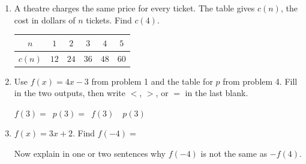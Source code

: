 \documentclass[12pt]{article}
\begin{document}
\begin{enumerate}[label=\textbf{\arabic*.}, leftmargin=1.15cm, itemsep=0pt, topsep=6pt]
\item \begin{minipage}[t]{\linewidth}\vspace{0pt}
A theatre charges the same price for every ticket. The table gives $c(n)$, the cost in dollars of $n$ tickets. Find $c(4)$.
\par\vspace{0.15cm}
\begin{center}
\begin{tabular}{|c|c|c|c|c|c|}
\hline
\textbf{$n$} & $1$ & $2$ & $3$ & $4$ & $5$ \\
\hline
\textbf{$c(n)$} & $12$ & $24$ & $36$ & $48$ & $60$ \\
\hline
\end{tabular}
\end{center}
\par\vspace*{2.9cm}\ansline
\end{minipage}

\item \begin{minipage}[t]{\linewidth}\vspace{0pt}
Use $f(x) = 4x - 3$ from problem 1 and the table for $p$ from problem 4. Fill in the two outputs, then write $<$, $>$, or $=$ in the last blank.
\par\vspace{0.35cm}
$f(3) = $~\ansblank \qquad $p(3) = $~\ansblank \qquad $f(3)$~\ansblank~$p(3)$
\par\vspace*{3.4cm}
\end{minipage}

\item \begin{minipage}[t]{\linewidth}\vspace{0pt}
$f(x) = 3x + 2$. \quad Find $f(-4) = $~\ansblank
\par\vspace{0.45cm}
Now explain in one or two sentences why $f(-4)$ is not the same as $-f(4)$.
\par\vspace{0.6cm}
\noindent\underline{\hspace{14.5cm}}
\par\vspace{0.95cm}
\noindent\underline{\hspace{14.5cm}}
\par\vspace{0.7cm}
\end{minipage}

\end{enumerate}
\end{document}
